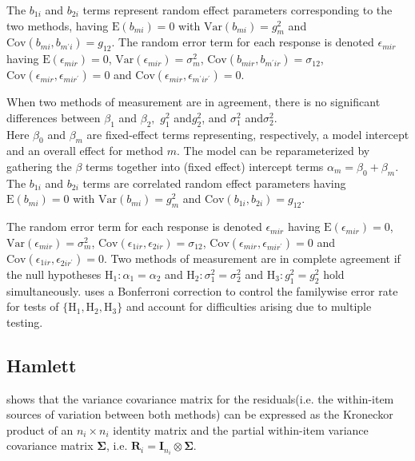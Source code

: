 \documentclass[12pt, a4paper]{report}
\theoremstyle{plain}
\theoremstyle{definition}
\theoremstyle{remark}
\begin{document}
	
	The $b_{1i}$ and $b_{2i}$ terms represent random effect parameters corresponding to the two methods, having $\mathrm{E}(b_{mi})=0$ with $\mathrm{Var}(b_{mi})=g^2_m$ and $\mathrm{Cov}(b_{mi}, b_{m^\prime i})=g_{12}.$ The random error term for each response is denoted $\epsilon_{mir}$ having $\mathrm{E}(\epsilon_{mir})=0$, $\mathrm{Var}(\epsilon_{mir})=\sigma^2_m$, $\mathrm{Cov}(b_{mir}, b_{m^\prime ir})=\sigma_{12}$, $\mathrm{Cov}(\epsilon_{mir}, \epsilon_{mir^\prime})= 0$ and $\mathrm{Cov}(\epsilon_{mir}, \epsilon_{m^\prime ir^\prime})= 0.$
	
	
	When two methods of measurement are in agreement, there is no significant differences between $\beta_1$ and $\beta_2,$ $g^2_1 $ and$ g^2_2$, and $\sigma^2_1 $ and$ \sigma^2_2$.\\
	\bigskip
	Here $\beta_0$ and $\beta_m$ are fixed-effect terms representing, respectively, a model intercept and an overall effect for method $m.$ The model can be reparameterized by gathering the $\beta$ terms together into (fixed effect) intercept terms $\alpha_m=\beta_0+\beta_m.$ The $b_{1i}$ and $b_{2i}$ terms are correlated random effect parameters having $\mathrm{E}(b_{mi})=0$ with $\mathrm{Var}(b_{mi})=g^2_m$ and $\mathrm{Cov}(b_{1i}, b_{2 i})=g_{12}.$ \\
	\bigskip
	
	The random error term for each response is denoted $\epsilon_{mir}$ having $\mathrm{E}(\epsilon_{mir})=0$, $\mathrm{Var}(\epsilon_{mir})=\sigma^2_m$, $\mathrm{Cov}(\epsilon_{1ir}, \epsilon_{2 ir})=\sigma_{12}$, $\mathrm{Cov}(\epsilon_{mir}, \epsilon_{mir^\prime})= 0$ and $\mathrm{Cov}(\epsilon_{1ir}, \epsilon_{2 ir^\prime})= 0.$ Two methods of measurement are in complete agreement if the null hypotheses $\mathrm{H}_1\colon \alpha_1 = \alpha_2$ and $\mathrm{H}_2\colon \sigma^2_1 = \sigma^2_2 $ and $\mathrm{H}_3\colon g^2_1= g^2_2$ hold simultaneously. \citet{ARoy2009} uses a Bonferroni correction to control the familywise error rate for tests of $\{\mathrm{H}_1, \mathrm{H}_2, \mathrm{H}_3\}$ and account for difficulties arising due to multiple testing. \\
	\bigskip
	
	
	
	
	
	
	
	
	
	
	\subsection{Hamlett}
	\citet{hamlett} shows that the variance covariance matrix for the residuals(i.e. the within-item sources of variation between both methods) can be expressed as the Kroneckor product of an $n_i \times n_i$ identity matrix and the partial within-item variance covariance matrix $\boldsymbol{\Sigma}$, i.e. $\boldsymbol{R}_{i} = \boldsymbol{I}_{n_{i}} \otimes \boldsymbol{\Sigma}$.
	
\end{document}
